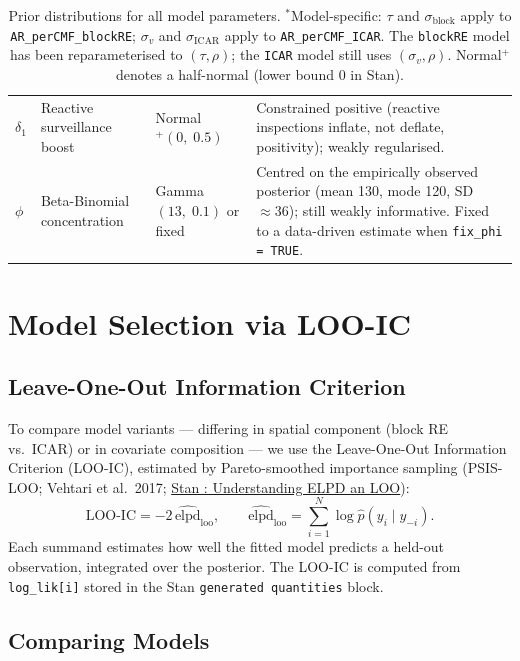 \documentclass[12pt,a4paper]{article}
\begin{document}
\begin{table}[ht]
\begin{tabular}{p{2.0cm}p{3.2cm}p{3.0cm}p{5.8cm}}
\addlinespace
$\delta_1$ & Reactive surveillance boost & Normal$^+(0,\; 0.5)$ & Constrained positive (reactive inspections inflate, not deflate, positivity); weakly regularised. \\
\addlinespace
$\phi$ & Beta-Binomial concentration & Gamma$(13,\; 0.1)$ or fixed & Centred on the empirically observed posterior (mean 130, mode 120, SD $\approx 36$); still weakly informative. Fixed to a data-driven estimate when \texttt{fix\_phi = TRUE}. \\
\bottomrule
\end{tabular}
\caption{Prior distributions for all model parameters. $^*$Model-specific: $\tau$ and $\sigma_{\text{block}}$ apply to \texttt{AR\_perCMF\_blockRE}; $\sigma_v$ and $\sigma_{\text{ICAR}}$ apply to \texttt{AR\_perCMF\_ICAR}. The \texttt{blockRE} model has been reparameterised to $(\tau,\rho)$; the \texttt{ICAR} model still uses $(\sigma_v,\rho)$. Normal$^+$ denotes a half-normal (lower bound 0 in Stan).}
\label{tab:priors}
\end{table}

\section{Model Selection via LOO-IC}

\subsection{Leave-One-Out Information Criterion}

To compare model variants --- differing in spatial component (block RE vs.\ ICAR) or in
covariate composition --- we use the Leave-One-Out Information Criterion (LOO-IC), estimated by
Pareto-smoothed importance sampling \mbox{(PSIS-LOO;} Vehtari et al.\ 2017;
\href{https://mc-stan.org/loo/reference/elpd.html}{Stan : Understanding ELPD an LOO}):
\begin{equation}
  \text{LOO-IC} = -2\,\widehat{\text{elpd}}_{\text{loo}},
  \qquad
  \widehat{\text{elpd}}_{\text{loo}} = \sum_{i=1}^{N} \log \hat{p}(y_i \mid y_{-i}).
\end{equation}
Each summand estimates how well the fitted model predicts a held-out observation, integrated
over the posterior. The LOO-IC is computed from \texttt{log\_lik[i]} stored in the Stan
\texttt{generated quantities} block.

\subsection{Comparing Models}
\end{document}
